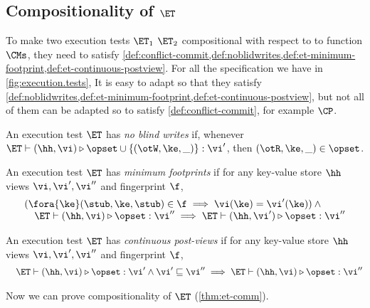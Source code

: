 \subsection{Compositionality of \( \ET \)}
\label{sec:et-comm}
\label{sec:et-comp}

To make two execution tests \( \ET_1 \) \( \ET_2 \) compositional with respect to to function \( \CMs \),
they need to satisfy \cref{def:conflict-commit,def:noblidwrites,def:et-minimum-footprint,def:et-continuous-postview}.
For all the specification we have in \cref{fig:execution.tests},
It is easy to adapt so that they satisfy \cref{def:noblidwrites,def:et-minimum-footprint,def:et-continuous-postview},
but not all of them can be adapted so to satisfy \cref{def:conflict-commit}, for example \( \CP \).

\begin{definition}
\label{def:noblidwrites}
An execution test $\ET$ has \emph{no blind writes} if, whenever $\ET \vdash (\hh, \vi) \triangleright \opset \cup \{(\otW, \ke, \_)\} : \vi'$, 
then $(\otR, \ke, \_) \in \opset$.
\end{definition}

\begin{definition}
\label{def:et-minimum-footprint}
An execution test $\ET$ has \emph{minimum footprints} if for any key-value store \( \hh \)
views \( \vi, \vi',\vi''\) and fingerprint \( \f \),
\[
\begin{array}{@{}l@{}}
    ( \fora{ \ke} (\stub, \ke, \stub) \in \f \implies \vi(\ke) = \vi'(\ke) ) \land {} \\
    \quad \ET \vdash (\hh, \vi) \triangleright \opset : \vi'' \implies \ET \vdash (\hh, \vi') \triangleright \opset : \vi''
\end{array}
\]
\end{definition}

\begin{definition}
\label{def:et-continuous-postview}
An execution test $\ET$ has \emph{continuous post-views} if for any key-value store \( \hh \)
views \( \vi, \vi',\vi''\) and fingerprint \( \f \), 
\[
\begin{array}{@{}l@{}}
    \quad \ET \vdash (\hh, \vi) \triangleright \opset : \vi' \land \vi' \sqsubseteq \vi'' \implies \ET \vdash (\hh, \vi) \triangleright \opset : \vi''
\end{array}
\]
\end{definition}

Now we can prove compositionality of \( \ET \) (\cref{thm:et-comm}).

